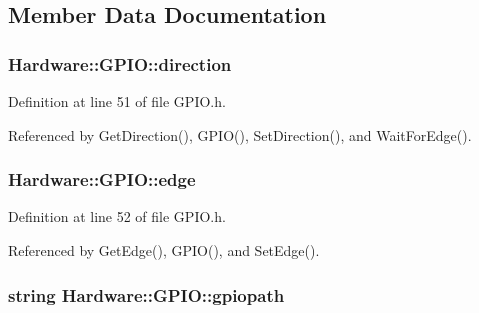 \subsection{Member Data Documentation}
\hypertarget{class_hardware_1_1_g_p_i_o_a77e93e4f6650507fdc4898d272d540e7}{}
\subsubsection[{direction}]{ Hardware\+::\+G\+P\+I\+O\+::direction\hspace{0.3cm}{\ttfamily [private]}}\label{class_hardware_1_1_g_p_i_o_a77e93e4f6650507fdc4898d272d540e7}


Definition at line 51 of file G\+P\+I\+O.\+h.



Referenced by Get\+Direction(), G\+P\+I\+O(), Set\+Direction(), and Wait\+For\+Edge().

\hypertarget{class_hardware_1_1_g_p_i_o_adf15f74f053069029e99934e28c109e0}{}
\subsubsection[{edge}]{ Hardware\+::\+G\+P\+I\+O\+::edge\hspace{0.3cm}{\ttfamily [private]}}\label{class_hardware_1_1_g_p_i_o_adf15f74f053069029e99934e28c109e0}


Definition at line 52 of file G\+P\+I\+O.\+h.



Referenced by Get\+Edge(), G\+P\+I\+O(), and Set\+Edge().

\hypertarget{class_hardware_1_1_g_p_i_o_ac47062ed6aba52b9e8506e1575bf5061}{}
\subsubsection[{gpiopath}]{\setlength{\rightskip}{0pt plus 5cm}string Hardware\+::\+G\+P\+I\+O\+::gpiopath\hspace{0.3cm}{\ttfamily [private]}}\label{class_hardware_1_1_g_p_i_o_ac47062ed6aba52b9e8506e1575bf5061}


